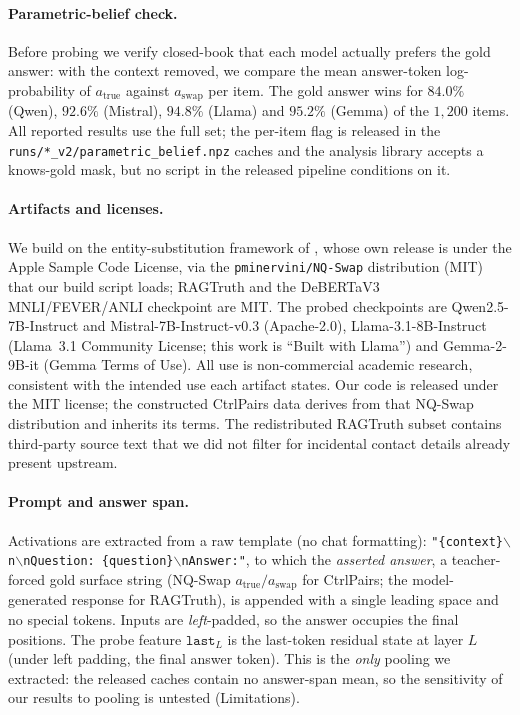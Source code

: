 \paragraph{Parametric-belief check.}
Before probing we verify closed-book that each model actually prefers the gold answer:
with the context removed, we compare the mean answer-token log-probability of
$a_{\mathrm{true}}$ against $a_{\mathrm{swap}}$ per item. The gold answer wins for
$84.0\%$ (Qwen), $92.6\%$ (Mistral), $94.8\%$ (Llama) and $95.2\%$ (Gemma) of the
$1{,}200$ items. All reported results use the full set; the per-item flag is released in
the \texttt{runs/*\_v2/parametric\_belief.npz} caches and the analysis library accepts a knows-gold
mask, but no script in the released pipeline conditions on it.

\paragraph{Artifacts and licenses.}
We build on the entity-substitution framework of \citet{longpre2021nqswap}, whose own
release is under the Apple Sample Code License, via the \texttt{pminervini/NQ-Swap}
distribution (MIT) that our build script loads; RAGTruth \citep{niu2024ragtruth} and the
DeBERTaV3 MNLI/FEVER/ANLI checkpoint \citep{nli_checkpoint,he2023debertav3} are MIT.
The probed checkpoints are Qwen2.5-7B-Instruct and Mistral-7B-Instruct-v0.3
(Apache-2.0), Llama-3.1-8B-Instruct (Llama~3.1 Community License; this work is
``Built with Llama'') and Gemma-2-9B-it (Gemma Terms of Use). All use is
non-commercial academic research, consistent with the intended use each artifact
states. Our code is released under the MIT license; the constructed
CtrlPairs data derives from that NQ-Swap distribution and inherits its terms. The redistributed RAGTruth
subset contains third-party source text that we did not filter for incidental contact
details already present upstream.

\paragraph{Prompt and answer span.}
Activations are extracted from a raw template (no chat formatting):
\texttt{"\{context\}$\backslash$n$\backslash$nQuestion: \{question\}$\backslash$nAnswer:"},
to which the \emph{asserted answer}, a teacher-forced gold surface string (NQ-Swap
$a_{\text{true}}/a_{\text{swap}}$ for CtrlPairs; the model-generated response for
RAGTruth), is appended with a single leading space and no special tokens. Inputs are
\emph{left}-padded, so the answer occupies the final positions. The probe feature
$\texttt{last}_L$ is the last-token residual state at layer $L$ (under left padding,
the final answer token). This is the \emph{only} pooling we extracted: the released
caches contain no answer-span mean, so the sensitivity of our results to pooling is
untested (Limitations).

